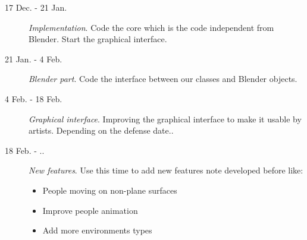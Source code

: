 \documentclass[a4paper,11pt]{article}
\begin{document}
\begin{description}
  \item[17 Dec. - 21 Jan.] \textit{Implementation}. Code the core which is the code independent from Blender. Start the graphical interface.
  \item[21 Jan. - 4 Feb.] \textit{Blender part}. Code the interface between our classes and Blender objects.
  \item[4 Feb. - 18 Feb.] \textit{Graphical interface}. Improving the graphical interface to make it usable by artists. Depending on the defense date..
  \item[18 Feb. - ..] \textit{New features}.
Use this time to add new features note developed before like:
  \begin{itemize}
    \item People moving on non-plane surfaces
    \item Improve people animation
    \item Add more environments types
  \end{itemize}
\end{description}











\begingroup




\endgroup
\end{document}

